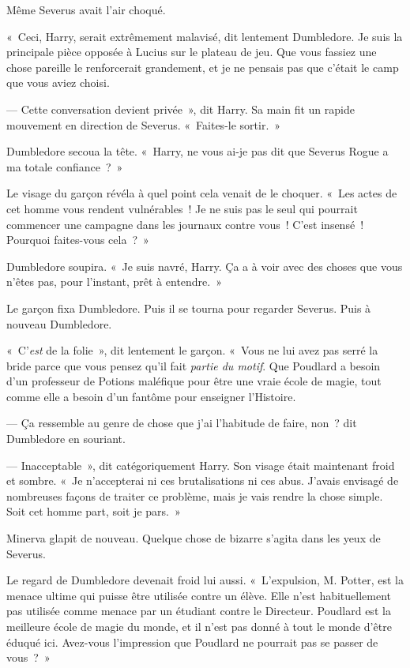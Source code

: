 Même Severus avait l'air choqué.

«~Ceci, Harry, serait extrêmement malavisé, dit lentement Dumbledore. Je suis la principale pièce opposée à Lucius sur le plateau de jeu. Que vous fassiez une chose pareille le renforcerait grandement, et je ne pensais pas que c'était le camp que vous aviez choisi.

--- Cette conversation devient privée~», dit Harry. Sa main fit un rapide mouvement en direction de Severus. «~Faites-le sortir.~»

Dumbledore secoua la tête. «~Harry, ne vous ai-je pas dit que Severus Rogue a ma totale confiance~?~»

Le visage du garçon révéla à quel point cela venait de le choquer. «~Les actes de cet homme vous rendent vulnérables~! Je ne suis pas le seul qui pourrait commencer une campagne dans les journaux contre vous~! C'est insensé~! Pourquoi faites-vous cela~?~»

Dumbledore soupira. «~Je suis navré, Harry. Ça a à voir avec des choses que vous n'êtes pas, pour l'instant, prêt à entendre.~»

Le garçon fixa Dumbledore. Puis il se tourna pour regarder Severus. Puis à nouveau Dumbledore.

«~C'\emph{est} de la folie~», dit lentement le garçon. «~Vous ne lui avez pas serré la bride parce que vous pensez qu'il fait \emph{partie du motif}. Que Poudlard a besoin d'un professeur de Potions maléfique pour être une vraie école de magie, tout comme elle a besoin d'un fantôme pour enseigner l'Histoire.

--- Ça ressemble au genre de chose que j'ai l'habitude de faire, non~? dit Dumbledore en souriant.

--- Inacceptable~», dit catégoriquement Harry. Son visage était maintenant froid et sombre. «~Je n'accepterai ni ces brutalisations ni ces abus. J'avais envisagé de nombreuses façons de traiter ce problème, mais je vais rendre la chose simple. Soit cet homme part, soit je pars.~»

Minerva glapit de nouveau. Quelque chose de bizarre s'agita dans les yeux de Severus.

Le regard de Dumbledore devenait froid lui aussi. «~L'expulsion, M. Potter, est la menace ultime qui puisse être utilisée contre un élève. Elle n'est habituellement pas utilisée comme menace par un étudiant contre le Directeur. Poudlard est la meilleure école de magie du monde, et il n'est pas donné à tout le monde d'être éduqué ici. Avez-vous l'impression que Poudlard ne pourrait pas se passer de vous~?~»

